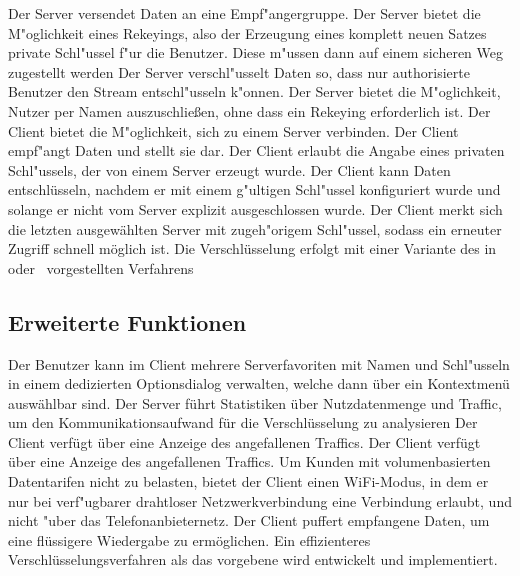 \documentclass[a4paper,10pt]{scrartcl}
\begin{document}
\begin{usecase}
 {Der Server versendet Daten an eine Empf"angergruppe.}
 {Der Server bietet die M"oglichkeit eines Rekeyings, also
                 der Erzeugung eines komplett neuen Satzes private Schl"ussel
                 f"ur die Benutzer. Diese m"ussen dann auf einem sicheren
                 Weg zugestellt werden}
 {Der Server verschl"usselt Daten so, dass nur authorisierte
                 Benutzer den Stream entschl"usseln k"onnen.}
 {Der Server bietet die M"oglichkeit, Nutzer per Namen auszuschließen,
                 ohne dass ein Rekeying erforderlich ist.}
 {Der Client bietet die M"oglichkeit, sich zu einem Server verbinden.}
 {Der Client empf"angt Daten und stellt sie dar.}
 {Der Client erlaubt die Angabe eines privaten Schl"ussels, der von
                 einem Server erzeugt wurde.}
 {Der Client kann Daten entschlüsseln, nachdem er mit einem
                 g"ultigen Schl"ussel konfiguriert wurde und solange er nicht
                 vom Server explizit ausgeschlossen wurde.}
 {Der Client merkt sich die letzten ausgewählten Server mit
                 zugeh"origem Schl"ussel, sodass ein erneuter Zugriff schnell möglich
                 ist.}
 {Die Verschlüsselung erfolgt mit einer Variante des in~\cite[Section 2.2]{Naor00}
                  oder~\cite{Garg10} vorgestellten Verfahrens}
\end{usecase}

\subsection{Erweiterte Funktionen}

\begin{usecase}
 {Der Benutzer kann im Client mehrere Serverfavoriten
                  mit Namen und Schl"usseln in einem dedizierten Optionsdialog verwalten,
                  welche dann über ein Kontextmenü auswählbar sind.}
 {Der Server führt Statistiken über Nutzdatenmenge und Traffic,
                  um den Kommunikationsaufwand für die Verschlüsselung zu
                  analysieren}
 {Der Client verfügt über eine Anzeige des angefallenen Traffics.}
 {Der Client verfügt über eine Anzeige des angefallenen Traffics.}
 {Um Kunden mit volumenbasierten Datentarifen nicht zu belasten,
                  bietet der Client einen WiFi-Modus, in dem er nur bei
                  verf"ugbarer drahtloser Netzwerkverbindung eine Verbindung erlaubt,
                  und nicht "uber das Telefonanbieternetz.}
 {Der Client puffert empfangene Daten, um eine flüssigere
                  Wiedergabe zu ermöglichen.}
 {Ein effizienteres Verschlüsselungsverfahren als das vorgebene
                  wird entwickelt und implementiert.}
\end{usecase}
\end{document}

